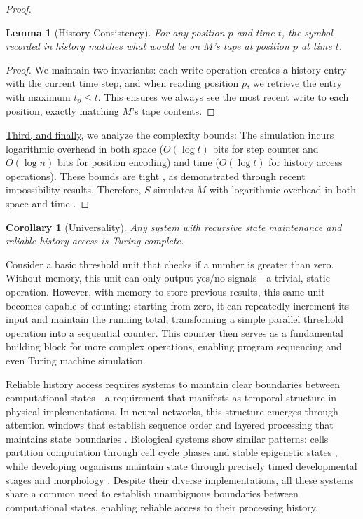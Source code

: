 \documentclass[12pt]{article}
\newtheorem{lemma}[theorem]{Lemma}
\newtheorem{corollary}[theorem]{Corollary}
\begin{document}
\begin{proof}
\begin{lemma}[History Consistency]
For any position $p$ and time $t$, the symbol recorded in history matches what would be on $M$'s tape at position $p$ at time $t$.
\end{lemma}

\begin{proof}
We maintain two invariants: each write operation creates a history entry with the current time step, and when reading position $p$, we retrieve the entry with maximum $t_p \leq t$.
This ensures we always see the most recent write to each position, exactly matching $M$'s tape contents.
\end{proof}

\vspace{0.5em}
\noindent\underline{Third, and finally}, we analyze the complexity bounds: The simulation incurs logarithmic overhead in both space ($O(\log t)$ bits for step counter and $O(\log n)$ bits for position encoding) and time ($O(\log t)$ for history access operations). These bounds are tight \cite{parzych2024memory,hhan2024new,boyle2024memory}, as demonstrated through recent impossibility results. Therefore, $S$ simulates $M$ with logarithmic overhead in both space and time \cite{savage1994space,vonkorff2019molecular,bennett1989time}.
\end{proof}

\begin{corollary}[Universality]
Any system with recursive state maintenance and reliable history access is Turing-complete.
\end{corollary}

\vspace{1em}

Consider a basic threshold unit that checks if a number is greater than zero.
Without memory, this unit can only output yes/no signals---a trivial, static operation.
However, with memory to store previous results, this same unit becomes capable of counting: starting from zero, it can repeatedly increment its input and maintain the running total, transforming a simple parallel threshold operation into a sequential counter.
This counter then serves as a fundamental building block for more complex operations, enabling program sequencing and even Turing machine simulation.

Reliable history access requires systems to maintain clear boundaries between computational states---a requirement that manifests as temporal structure in physical implementations.
In neural networks, this structure emerges through attention windows that establish sequence order and layered processing that maintains state boundaries \cite{martini2015information,quentin2019differential}.
Biological systems show similar patterns: cells partition computation through cell cycle phases and stable epigenetic states \cite{bruno2022epigenetic}, while developing organisms maintain state through precisely timed developmental stages and morphology \cite{turing1952chemical}.
Despite their diverse implementations, all these systems share a common need to establish unambiguous boundaries between computational states, enabling reliable access to their processing history.
\end{document}
